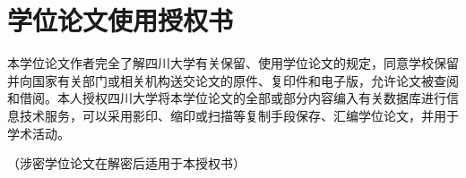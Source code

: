 
\chapter{学位论文使用授权书}
本学位论文作者完全了解四川大学有关保留、使用学位论文的规定，同意学校保留并向国家有关部门或相关机构送交论文的原件、复印件和电子版，允许论文被查阅和借阅。本人授权四川大学将本学位论文的全部或部分内容编入有关数据库进行信息技术服务，可以采用影印、缩印或扫描等复制手段保存、汇编学位论文，并用于学术活动。

（涉密学位论文在解密后适用于本授权书）
\vspace{4cm}
\autographak
